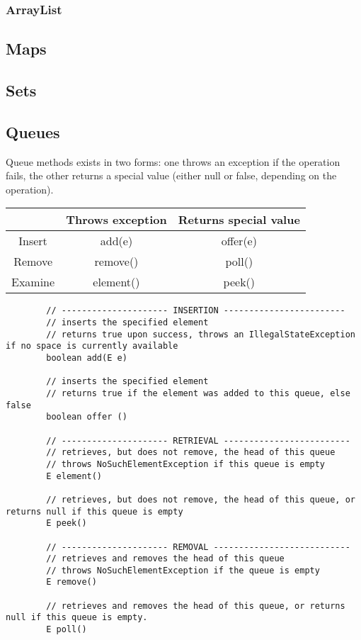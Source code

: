 \documentclass{scrartcl}
\begin{document}
\subsubsection{ArrayList}




\subsection{Maps}

\subsection{Sets}

\subsection{Queues}

    Queue methods exists in two forms: one throws an exception if the operation fails, the other returns a special value (either null or false, depending on the operation).

    \bigskip

    \begin{tabular}{|c|c|c|}
        \hline
        & Throws exception & Returns special value \\
        \hline
        Insert & add(e) & offer(e) \\
        \hline
        Remove & remove() & poll() \\
        \hline
        Examine & element() & peek() \\
        \hline
    \end{tabular}

    \bigskip

    \begin{lstlisting}
        // --------------------- INSERTION ------------------------
        // inserts the specified element
        // returns true upon success, throws an IllegalStateException if no space is currently available
        boolean add(E e)

        // inserts the specified element
        // returns true if the element was added to this queue, else false
        boolean offer ()

        // --------------------- RETRIEVAL -------------------------
        // retrieves, but does not remove, the head of this queue
        // throws NoSuchElementException if this queue is empty
        E element()

        // retrieves, but does not remove, the head of this queue, or returns null if this queue is empty
        E peek()

        // --------------------- REMOVAL ---------------------------
        // retrieves and removes the head of this queue
        // throws NoSuchElementException if the queue is empty
        E remove()

        // retrieves and removes the head of this queue, or returns null if this queue is empty.
        E poll()
    \end{lstlisting}
\end{document}
